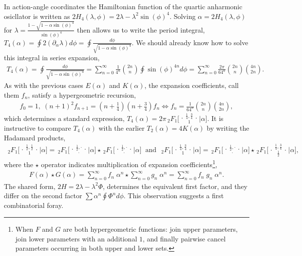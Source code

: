 \documentclass[nofootinbib,preprint]{revtex4-1}
\newcommand{\tFo}[3]{\,_2F_1 \bigg[ 
\genfrac..{0pt}{}{#1}{#2}\bigg| #3 \bigg]}
\newcommand{\tFoIn}[3]{\,_2F_1 \Big[ 
\genfrac..{0pt}{}{#1}{#2}\Big| #3 \Big]}
\begin{document}
In action-angle coordinates the Hamiltonian function of the quartic anharmonic osicllator 
is written as $2H_4(\lambda,\phi) = 2\lambda-\lambda^2\sin(\phi)^4$. 
Solving $\alpha=2H_4(\lambda,\phi)$ for $\lambda = \frac{1-\sqrt{1-\alpha \sin(\phi)^4}}{\sin(\phi)^4} $ 
then allows us to write the period integral, 
$T_4(\alpha)=\oint 2(\partial_{\alpha}\lambda) d\phi =  \oint \frac{d\phi}{\sqrt{1-\alpha \sin(\phi)^4}}$. 
We should already know how to solve this integral in series expansion, 
\begin{eqnarray}
T_4(\alpha)= \oint \frac{d\phi}{\sqrt{1-\alpha \sin(\phi)^4}}
=\sum_{n=0}^{\infty}\frac{1}{4^n}\binom{2n}{n}\oint \sin(\phi)^{4n}d\phi
=\sum_{n=0}^{\infty}\frac{2\pi}{64^n}\binom{2n}{n}\binom{4n}{2n}. \nonumber
\end{eqnarray}
As with the previous cases $E(\alpha)$ and $K(\alpha)$, the expansion 
coefficients, call them $f_n$, satisfy a hypergeometric recursion, 
\begin{eqnarray}
f_0=1, \; (n+1)^2 f_{n+1} = (n+\tfrac{1}{4})(n+\tfrac{3}{4})f_n
\iff f_n = \frac{1}{64^{n}}\binom{2n}{n}\binom{4n}{2n}, \nonumber 
\end{eqnarray}
which determines a standard expression, $T_4(\alpha) = 2\pi\tFoIn{\frac{1}{4},\frac{3}{4}}{1}{\alpha}$.
It is instructive to compare $T_4(\alpha)$ with the earlier $T_2(\alpha)=4 K(\alpha)$ by 
writing the Hadamard products, 
\begin{eqnarray}
\tFo{\frac{1}{2},\frac{1}{2}}{1}{\alpha}=\tFo{\frac{1}{2},\cdot}{\cdot}{\alpha}
\star \tFo{\frac{1}{2},\cdot}{\cdot}{\alpha}
\;\; \text{and} \;\;
\tFo{\frac{1}{4},\frac{3}{4}}{1}{\alpha}=\tFo{\frac{1}{2},\cdot}{\cdot}{\alpha}
\star \tFo{\frac{1}{4},\frac{3}{4}}{\frac{1}{2}}{\alpha}, \nonumber
\end{eqnarray}
where the $\star$ operator indicates multiplication of expansion 
coefficients\footnote{When $F$ and $G$ are both hypergeometric functions: 
join upper parameters, join lower parameters with an additional $1$, 
and finally pairwise cancel parameters occurring in both upper and lower sets. }, 
\begin{eqnarray}
F(\alpha)\star G(\alpha) = \sum_{n=0}^{\infty} f_n\;\alpha^n \star \sum_{n=0}^{\infty} g_n\;\alpha^n 
= \sum_{n=0}^{\infty} f_n \; g_n \; \alpha^n  \nonumber .
\end{eqnarray}
The shared form, $2H=2\lambda-\lambda^2 \Phi$, determines the equivalent first factor, and they 
differ on the second factor $\sum \alpha^n \oint \Phi^n d\phi$. This observation suggests 
a first combinatorial foray.
\end{document}

